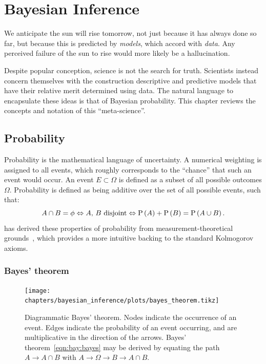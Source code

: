 \chapter{Bayesian Inference}
\label{chp:bay}

\epigraph{We anticipate the sun will rise tomorrow, not just because it has always done so far, but because this is predicted by {\em models}, which accord with {\em data}. Any perceived failure of the sun to rise would more likely be a hallucination.}{\davidmackay{}}

Despite popular conception, science is not the search for truth. Scientists instead concern themselves with the construction descriptive and predictive models that have their relative merit determined using data.
The natural language to encapsulate these ideas is that of Bayesian probability. This chapter reviews the concepts and notation of this ``meta-science''.

\section{Probability}
\label{sec:bay:prob}

Probability is the mathematical language of uncertainty. 
A numerical weighting is assigned to all events, which roughly corresponds to the ``chance'' that such an event would occur. An event \(E\subset \Omega\) is defined as a subset of all possible outcomes \(\Omega\). Probability is defined as being additive over the set of all possible events, such that:
\begin{equation}
  A\cap B = \phi \Leftrightarrow \text{\(A\), \(B\) disjoint} \Leftrightarrow \mathrm{P}\left(A\right) + \mathrm{P}\left(B\right) = \mathrm{P}\left(A\cup B\right).
\end{equation}
\johnskilling{} has derived these properties of probability from measurement-theoretical grounds~\citep[chap. 1]{Bayesian_methods_in_cosmology}, which provides a more intuitive backing to the standard Kolmogorov axioms.

\subsection{Bayes' theorem}

\begin{figure}[tp]
  \centering
  \texttt{[image: chapters/bayesian\_inference/plots/bayes\_theorem.tikz]}
  \caption{Diagrammatic Bayes' theorem. Nodes indicate the occurrence of an event. Edges indicate the probability of an event occurring, and are multiplicative in the direction of the arrows. Bayes' theorem~\protect\eqref{eqn:bay:bayes} may be derived by equating the path \(A\to A\cap B\) with \(A\to\Omega\to B\to A\cap B\).}\label{fig:bay:bayes_theorem}
\end{figure}


